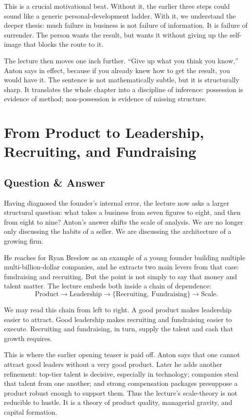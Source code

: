 This is a crucial motivational beat. Without it, the earlier three steps could sound like a generic personal-development ladder. With it, we understand the deeper thesis: much failure in business is not failure of information. It is failure of surrender. The person wants the result, but wants it without giving up the self-image that blocks the route to it.

The lecture then moves one inch further. ``Give up what you think you know,'' Anton says in effect, because if you already knew how to get the result, you would have it. The sentence is not mathematically subtle, but it is structurally sharp. It translates the whole chapter into a discipline of inference: possession is evidence of method; non-possession is evidence of missing structure.

\section{From Product to Leadership, Recruiting, and Fundraising}

\subsection{Question \& Answer}

Having diagnosed the founder's internal error, the lecture now asks a larger structural question: what takes a business from seven figures to eight, and then from eight to nine? Anton's answer shifts the scale of analysis. We are no longer only discussing the habits of a seller. We are discussing the architecture of a growing firm.

He reaches for Ryan Breslow as an example of a young founder building multiple multi-billion-dollar companies, and he extracts two main levers from that case: fundraising and recruiting. But the point is not simply to say that money and talent matter. The lecture embeds both inside a chain of dependence:
\begin{equation}
\text{Product} \to \text{Leadership} \to \{\text{Recruiting},\ \text{Fundraising}\} \to \text{Scale}.
\end{equation}

We may read this chain from left to right. A good product makes leadership easier to attract. Good leadership makes recruiting and fundraising easier to execute. Recruiting and fundraising, in turn, supply the talent and cash that growth requires.

This is where the earlier opening teaser is paid off. Anton says that one cannot attract good leaders without a very good product. Later he adds another refinement: top-tier talent is decisive, especially in technology; companies steal that talent from one another; and strong compensation packages presuppose a product robust enough to support them. Thus the lecture's scale-theory is not reducible to hustle. It is a theory of product quality, managerial gravity, and capital formation.

